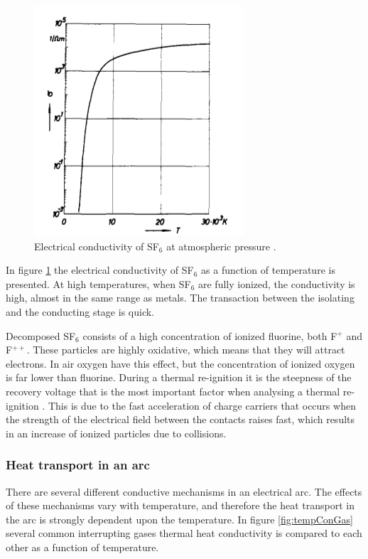 \documentclass[10pt,a4paper]{article}
\begin{document}
\begin{figure}[H]
\centering
\includegraphics[scale=0.5]{Bilder/Theory/SF6Conduct.png}
\caption{Electrical conductivity of SF$_6$ at atmospheric pressure \cite{bib:IPSF6AQM}.} \label{fig:condSF6}
\end{figure}

In figure \ref{fig:condSF6} the electrical conductivity of SF$_6$ as a function of temperature is presented. At high temperatures, when SF$_6$ are fully ionized, the conductivity is high, almost in the same range as metals. The transaction between the isolating and the conducting stage is quick. 

Decomposed SF$_6$ consists of a high concentration of ionized fluorine, both F$^{+}$ and F$^{++}$. These particles are highly oxidative, which means that they will attract electrons. In air oxygen have this effect, but the concentration of ionized oxygen is far lower than fluorine. During a thermal re-ignition it is the steepness of the recovery voltage that is the most important factor when analysing a thermal re-ignition \cite{bib:HVEbreak}. This is due to the fast acceleration of charge carriers that occurs when the strength of the electrical field between the contacts raises fast, which results in an increase of ionized particles due to collisions. 
   
\subsubsection{Heat transport in an arc} \label{sec:HeatTransport}
There are several different conductive mechanisms in an electrical arc. The effects of these mechanisms vary with temperature, and therefore the heat transport in the arc is strongly dependent upon the temperature. In figure \ref{fig:tempConGas} several common interrupting gases thermal heat conductivity is compared to each other as a function of temperature.
\end{document}
